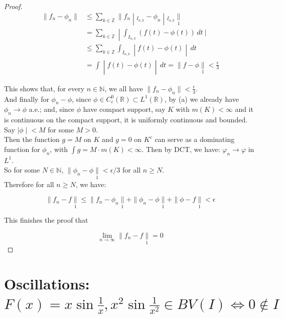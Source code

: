 \documentclass{qlnotes-export}
\begin{document}
\begin{proof}
\[\begin{matrix}
{\parallel f_{n} - \phi_{n} \parallel} & \left. \leq \sum\limits_{k \in {\mathbb{Z}}} \parallel f_{n} \middle| {}_{I_{n,k}} - \phi_{n} \middle| {}_{I_{n,k}}\underset{1}{\parallel} \right. \\
 & \left. = \sum\limits_{k \in {\mathbb{Z}}} \middle| \int_{I_{n,k}}(f(t) - \phi(t))\, dt\ | \right. \\
 & \left. \leq \sum\limits_{k \in {\mathbb{Z}}}\int_{I_{n,k}} \middle| f(t) - \phi(t) \middle| \, dt \right. \\
 & \left. = \int \middle| f(t) - \phi(t) \middle| \, dt = \parallel f - \phi\underset{1}{\parallel} < \frac{\epsilon}{3} \right.
\end{matrix}\]

This shows that, for every \(n \in {\mathbb{N}}\), we all have \(\parallel f_{n} - \phi_{n} \parallel < \frac{\epsilon}{3}\).\\
And finally for \(\phi_{n} - \phi\), since \(\phi \in C_{c}^{0}({\mathbb{R}}) \subset L^{1}({\mathbb{R}})\), by (a) we already have \(\phi_{n}\rightarrow\phi\) a.e.; and, since \(\phi\) have compact support, say \(K\) with \(m(K) < \infty\) and it is continuous on the compact support, it is uniformly continuous and bounded. Say \(\left. |\phi \middle| < M \right.\) for some \(M > 0\).\\
Then the function \(g = M\) on \(K\) and \(g = 0\) on \(K^{c}\) can serve as a dominating function for \(\phi_{n}\), with \(\int g = M \cdot m(K) < \infty\). Then by DCT, we have: \(\varphi_{n}\rightarrow\varphi\) in \(L^{1}\).\\
So for some \(N \in {\mathbb{N}}\), \(\parallel \phi_{n} - \phi\underset{1}{\parallel} < \epsilon/3\) for all \(n \geq N\).\\
Therefore for all \(n \geq N\), we have:

\[\parallel f_{n} - f\underset{1}{\parallel} \leq \parallel f_{n} - \phi_{n}\underset{1}{\parallel} + \parallel \phi_{n} - \phi\underset{1}{\parallel} + \parallel \phi - f\underset{1}{\parallel} < \epsilon\]

This finishes the proof that

\[\lim\limits_{n\rightarrow\infty} \parallel f_{n} - f\underset{1}{\parallel} = 0\]

\end{proof}

\section{\texorpdfstring{Oscillations: \(F(x) = x\sin\frac{1}{x},x^{2}\sin\frac{1}{x^{2}} \in BV(I)\Leftrightarrow 0 \notin I\)}{Oscillations: F(x) = x\textbackslash sin\textbackslash frac\{1\}\{x\},x\^{}\{2\}\textbackslash sin\textbackslash frac\{1\}\{x\^{}\{2\}\} \textbackslash in BV(I)\textbackslash Leftrightarrow 0 \textbackslash notin I}}\label{oscillations-fxxsinfrac1xx2sinfrac1x2in-bvi-iff-0not-in-i}
\end{document}
